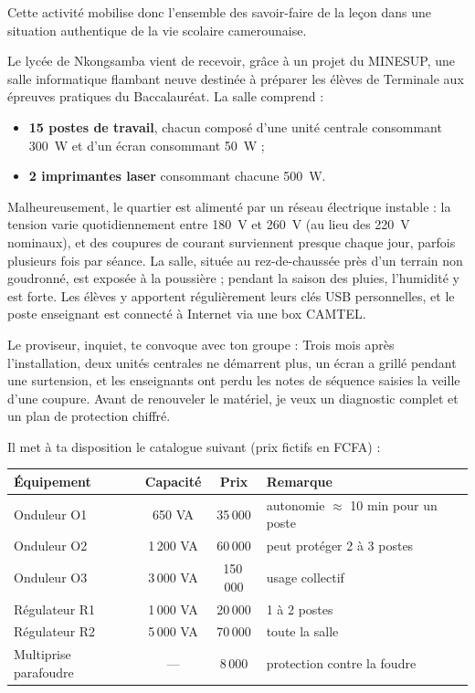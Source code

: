 \documentclass[11pt]{article}
\newcounter{popsec}
\newcounter{popsub}
\newcommand{\courssub}[1]{%
  \stepcounter{popsub}%
  \par\vspace{9pt}\noindent{\popxbold\fontsize{11.5}{13}\selectfont\color{popink}{\color{poporange}\thepopsec.\thepopsub}\hspace{6pt}#1}\par\nopagebreak\vspace{4pt}
}
\begin{document}
Cette activité mobilise donc l'ensemble des savoir-faire de la leçon dans une situation authentique de la vie scolaire camerounaise.

\courssub{Situation}

Le lycée de Nkongsamba vient de recevoir, grâce à un projet du MINESUP, une salle informatique flambant neuve destinée à préparer les élèves de Terminale aux épreuves pratiques du Baccalauréat. La salle comprend :

\begin{itemize}
\item \textbf{15 postes de travail}, chacun composé d'une unité centrale consommant \SI{300}{W} et d'un écran consommant \SI{50}{W} ;
\item \textbf{2 imprimantes laser} consommant chacune \SI{500}{W}.
\end{itemize}

Malheureusement, le quartier est alimenté par un réseau électrique instable : la tension varie quotidiennement entre \SI{180}{V} et \SI{260}{V} (au lieu des \SI{220}{V} nominaux), et des coupures de courant surviennent presque chaque jour, parfois plusieurs fois par séance. La salle, située au rez-de-chaussée près d'un terrain non goudronné, est exposée à la poussière ; pendant la saison des pluies, l'humidité y est forte. Les élèves y apportent régulièrement leurs clés USB personnelles, et le poste enseignant est connecté à Internet via une box CAMTEL.

Le proviseur, inquiet, te convoque avec ton groupe : \og Trois mois après l'installation, deux unités centrales ne démarrent plus, un écran a grillé pendant une surtension, et les enseignants ont perdu les notes de séquence saisies la veille d'une coupure. Avant de renouveler le matériel, je veux un diagnostic complet et un plan de protection chiffré. \fg

Il met à ta disposition le catalogue suivant (prix fictifs en FCFA) :

\begin{center}
\begin{tabularx}{\linewidth}{|l|c|c|X|}
\hline
\rowcolor{popblueL} \textbf{Équipement} & \textbf{Capacité} & \textbf{Prix} & \textbf{Remarque} \\
\hline
Onduleur O1 & 650 VA & 35\,000 & autonomie $\approx$ 10 min pour un poste \\
\hline
Onduleur O2 & 1\,200 VA & 60\,000 & peut protéger 2 à 3 postes \\
\hline
Onduleur O3 & 3\,000 VA & 150\,000 & usage collectif \\
\hline
Régulateur R1 & 1\,000 VA & 20\,000 & 1 à 2 postes \\
\hline
Régulateur R2 & 5\,000 VA & 70\,000 & toute la salle \\
\hline
Multiprise parafoudre & --- & 8\,000 & protection contre la foudre \\
\hline
\end{tabularx}
\end{center}
\end{document}
